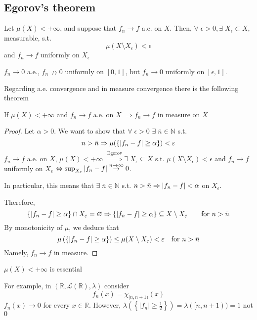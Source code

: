 \subsection{Egorov's theorem}
\begin{theorem}[Egorov]
    Let \(\mu(X) < +\infty\), and suppose that \(f_n \to f\) a.e. on \(X\). Then, \(\forall \; \epsilon > 0, \exists \; X_{\epsilon} \subset X\), measurable, s.t. 
    \[
        \mu(X \setminus X_{\epsilon}) < \epsilon
    \]
    and \(f_n \to f\) uniformly on \(X_{\epsilon}\)
\end{theorem}
\begin{example}
    \(f_n \to 0\) a.e., \(f_n \nrightarrow 0\) uniformly on \([0,1]\), but \(f_n \to 0\) uniformly on \([\epsilon, 1]\).
    
\end{example}
Regarding a.e. convergence and in measure convergence there is the following theorem
\begin{theorem}
    If \(\mu(X) < +\infty\) and \(f_n \to f\) a.e. on \(X\) \(\Rightarrow f_n \to f\) in measure on \(X\)
\end{theorem}
\begin{proof}
    Let \(\alpha > 0\). We want to show that \(\forall \; \epsilon > 0\) \(\exists \; \bar{n} \in \mathbb{N}\) s.t. 
    \[
        n > \bar{n} \Rightarrow \mu(\left\lbrace \abs{f_n -f} \geq \alpha\right\rbrace) <\varepsilon
    \]
    \(f_n \to f\) a.e. on \(X\), \(\mu(X) < +\infty\) \(\overset{\text{Egorov}}{\Rightarrow} \exists \; X_{\epsilon} \subseteq X\) s.t. \(\mu(X \setminus X_{\epsilon}) < \epsilon\) and \(f_n \to f\) uniformly on \(X_{\epsilon}\) \(\Leftrightarrow \sup_{X_{\varepsilon}} \abs{f_n - f} \overset{n\to \infty}{\to} 0\).

    In particular, this means that \(\exists \; \bar{n} \in \mathbb{N}\) s.t. \(n > \bar{n} \Rightarrow \abs{f_n -f} < \alpha\) on \(X_{\epsilon}\).

    Therefore, 
    \[
        \left\{ \abs{f_n -f} \geq \alpha \right\} \cap  X_{\varepsilon} = \varnothing \Rightarrow \left\{ \abs{f_n -f} \geq \alpha \right\} \subseteq X \setminus X_{\varepsilon} \qquad \text{for } n> \bar{n} 
    \]
    By monotonicity of \(\mu\), we deduce that
    \[
        \mu\left(\left\{ \abs{f_n -f} \geq \alpha \right\}\right) \leq \mu(X \setminus X_{\varepsilon}) < \varepsilon \quad \mbox{for }n> \bar{n}
    \]
    Namely, \(f_n \to f\) in measure.
\end{proof}
\begin{remark}
    \(\mu(X) < +\infty\) is essential
\end{remark}
For example, in \((\mathbb{R}, \mathcal{L}(\mathbb{R}), \lambda)\) consider
\[
    f_n (x) = \chi_{[n, n+1)}(x)
\]
\(f_n(x) \to 0\) for every \(x \in \mathbb{R}\). However, \(\lambda(\left\lbrace \vert f_n \vert \geq \frac{1}{2}\right\rbrace) = \lambda([n, n+1)) = 1\) not \(0\)
